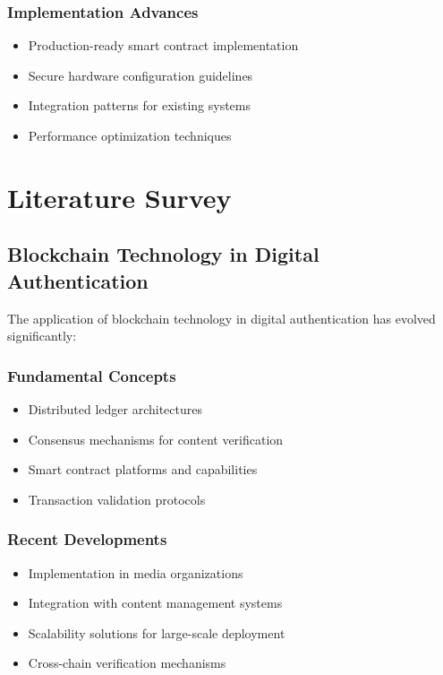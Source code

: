 \documentclass[conference]{IEEEtran}
\begin{document}
\subsubsection{Implementation Advances}
\begin{itemize}
    \item Production-ready smart contract implementation
    \item Secure hardware configuration guidelines
    \item Integration patterns for existing systems
    \item Performance optimization techniques
\end{itemize}

\section{Literature Survey}
\subsection{Blockchain Technology in Digital Authentication}
The application of blockchain technology in digital authentication has evolved significantly:

\subsubsection{Fundamental Concepts}
\begin{itemize}
    \item Distributed ledger architectures
    \item Consensus mechanisms for content verification
    \item Smart contract platforms and capabilities
    \item Transaction validation protocols
\end{itemize}

\subsubsection{Recent Developments}
\begin{itemize}
    \item Implementation in media organizations \cite{ref1}
    \item Integration with content management systems
    \item Scalability solutions for large-scale deployment
    \item Cross-chain verification mechanisms
\end{itemize}
\end{document}
